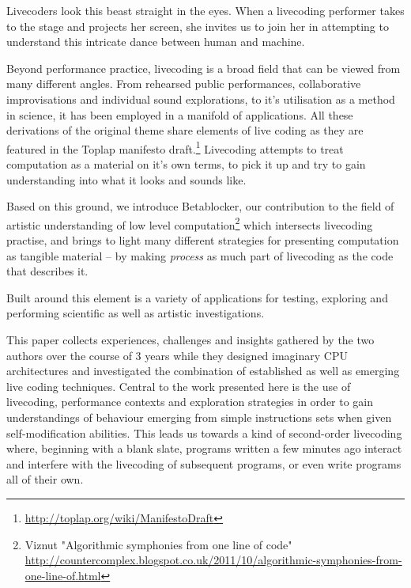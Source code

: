 \documentclass[letterpaper, 12pt]{article}
\begin{document}
Livecoders look this beast straight in the eyes. 
When a livecoding performer takes to the stage and projects her screen, she invites us to join her in attempting to understand this intricate dance between human and machine. 

Beyond performance practice, livecoding is a broad field that can be viewed from many different angles.
From rehearsed public performances, collaborative improvisations and individual sound explorations, to it's utilisation as a method in science, it has been employed in a manifold of applications.
All these derivations of the original theme share elements of live coding as they are featured in the Toplap manifesto draft.\footnote{\url{http://toplap.org/wiki/ManifestoDraft}} \citep{ward2004-liv}
Livecoding attempts to treat computation as a material on it's own terms, to pick it up and try to gain understanding into what it looks\citep{mclean2010-vis} and sounds like.

Based on this ground, we introduce Betablocker, our contribution to the field of artistic understanding of low level computation\citep{2006-the}\footnote{Viznut "Algorithmic symphonies from one line of code" \url{http://countercomplex.blogspot.co.uk/2011/10/algorithmic-symphonies-from-one-line-of.html}} which intersects livecoding practise, and brings to light many different strategies for presenting computation as tangible material -- by making \emph{process} as much part of livecoding as the code that describes it.

Built around this element is a variety of applications for testing, exploring and performing scientific as well as artistic investigations.


This paper collects experiences, challenges and insights gathered by the two authors over the course of 3 years while they designed imaginary CPU architectures and investigated the combination of established as well as emerging live coding techniques.
Central to the work presented here is the use of livecoding, performance contexts and exploration strategies in order to gain understandings of behaviour emerging from simple instructions sets when given self-modification abilities. 
This leads us towards a kind of second-order livecoding where, beginning with a blank slate, programs written a few minutes ago interact and interfere with the livecoding of subsequent programs, or even write programs all of their own.
\parskip 18pt
\end{document}
